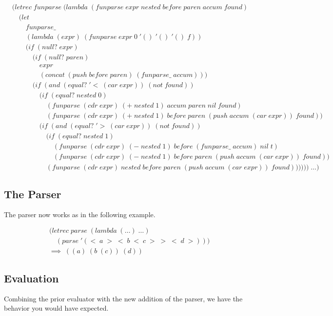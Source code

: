 \documentclass[11pt]{article}
\begin{document}
\begin{align*}
& (letrec \; funparse \; (lambda \; (funparse \; expr \; nested \; before \; paren \; accum \; found) \; 
\\& \quad (let \; 
\\& \qquad funparse\_ \; 
\\& \qquad (lambda \; (expr) \; (funparse \; expr \; 0 \; '() \; '() \; '() \; f))
\\& \qquad (if \; (null? \; expr)
\\& \qquad \quad (if \; (null? \; paren) \; 
\\& \qquad \qquad expr
\\& \qquad \qquad (concat \; (push \; before \; paren) \; (funparse\_ \; accum)))
\\& \qquad \quad (if \; (and \; (equal? \; '< \; (car \; expr)) \; (not \; found))
\\& \qquad \qquad (if \; (equal? \; nested \; 0)
\\& \qquad \qquad \quad (funparse \; (cdr \; expr) \; (+ \; nested \; 1) \; accum \; paren \; nil \; found)
\\& \qquad \qquad \quad (funparse \; (cdr \; expr) \; (+ \; nested \; 1) \; before \; paren \; (push \; accum \; (car \; expr)) \; found))
\\& \qquad \qquad (if \; (and \; (equal? \; '> \; (car \; expr)) \; (not \; found))
\\& \qquad \qquad \quad (if \; (equal? \; nested \; 1)
\\& \qquad \qquad \qquad (funparse \; (cdr \; expr) \; (- \; nested \; 1) \; before \; (funparse\_ \; accum) \; nil \; t)
\\& \qquad \qquad \qquad (funparse \; (cdr \; expr) \; (- \; nested \; 1) \; before \; paren \; (push \; accum \; (car \; expr)) \; found))
\\& \qquad \qquad \quad (funparse \; (cdr \; expr) \; nested \; before \; paren \; (push \; accum \; (car \; expr)) \; found)))))) \; \dots)
\end{align*}

\subsection{The Parser}
The parser now works as in the following example.

\begin{align*}
& (letrec \; parse \; (lambda \; (\dots) \; \dots)
\\& \quad (parse \; '(< \; a \; > \; < \; b \; < \; c \; > \; > \; < \; d \; >)))
\\& \implies \; ((a) \; (b \; (c)) \; (d))
\end{align*}

\subsection{Evaluation}
Combining the prior evaluator with the new addition of the parser, we have the behavior you would have expected.
\end{document}
